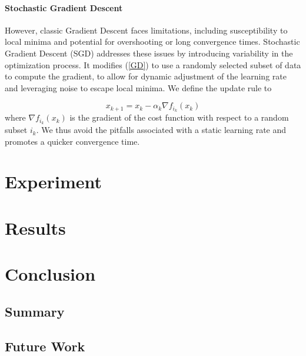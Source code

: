 \documentclass[a4paper]{report}
\begin{document}
\subsubsection{Stochastic Gradient Descent}

However, classic Gradient Descent faces limitations, including susceptibility to local minima and potential for overshooting or long convergence times. Stochastic Gradient Descent (SGD) addresses these issues by introducing variability in the optimization process. It modifies (\ref{GD}) to use a randomly selected subset of data to compute the gradient, to allow for dynamic adjustment of the learning rate and leveraging noise to escape local minima. We define the update rule to 

\begin{equation}\label{SGD}
x_{k+1} = x_k - \alpha_k \nabla f_{i_k}(x_k)	
\end{equation}
where $\nabla f_{i_k}(x_k)$ is the gradient of the cost function with respect to a random subset $i_k$. We thus avoid the pitfalls associated with a static learning rate and promotes a quicker convergence time.

\chapter{Experiment}


\chapter{Results}

\chapter{Conclusion}
\section{Summary}

\section{Future Work}
\end{document}
